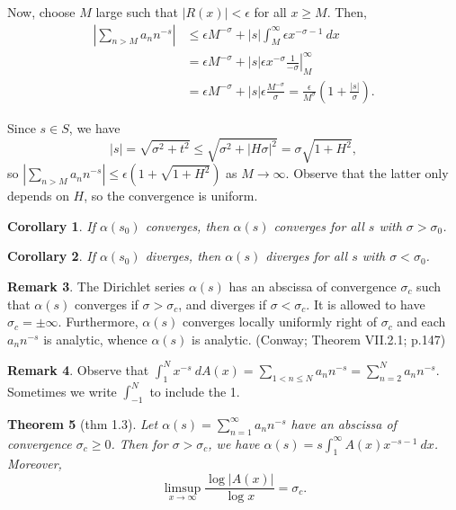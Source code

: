 \documentclass[11pt]{article}
\newtheorem{thm}{Theorem}[subsection]
\newtheorem{cor}[thm]{Corollary}
\theoremstyle{definition}
\newtheorem{remark}[thm]{Remark}
\newcommand{\s}[0]{\sigma}
\newcommand{\abs}[1]{\left\lvert#1\right\rvert} %
\begin{document}
Now, choose $M$ large such that $\abs{R(x)}<\epsilon$ for all $x\ge M$. Then,
\begin{align*}
  \abs{\sum_{n>M}a_nn^{-s}}
  &\le \epsilon M^{-\sigma} + \abs{s}\int_M^\infty \epsilon x^{-\sigma-1} ~dx \\
  &= \epsilon M^{-\s} + \left.\abs{s}\epsilon x^{-\s} \frac1{-\s} \right|_M^\infty \\
  &= \epsilon M^{-\s} + \abs{s} \epsilon \frac{M^{-\s}}{\s}
  = \frac{\epsilon}{M^\s} \left(1 + \frac{\abs{s}}{\s}\right) .
\end{align*}

Since $s\in S$, we have
\[
  \abs{s} = \sqrt{\s^2+t^2} \le \sqrt{\s^2 + \abs{H\s}^2} = \s\sqrt{1+H^2} ,
\]
so $\abs{\sum_{n>M}a_nn^{-s}} \le \epsilon(1+\sqrt{1+H^2})$ as $M\to\infty$. Observe that
the latter only depends on $H$, so the convergence is uniform.
\qedhere

\begin{cor}
If $\alpha(s_0)$ converges, then $\alpha(s)$ converges for all $s$ with $\sigma>\sigma_0$.
\end{cor}

\begin{cor}
If $\alpha(s_0)$ diverges, then $\alpha(s)$ diverges for all $s$ with $\sigma<\sigma_0$.
\end{cor}

\begin{remark}
The Dirichlet series $\alpha(s)$ has an abscissa of convergence $\sigma_c$ such that
$\alpha(s)$ converges if $\sigma>\sigma_c$, and diverges if $\sigma<\sigma_c$. It is
allowed to have $\sigma_c=\pm\infty$. Furthermore, $\alpha(s)$ converges locally uniformly
right of $\sigma_c$ and each $a_nn^{-s}$ is analytic, whence $\alpha(s)$ is analytic.
(Conway; Theorem VII.2.1; p.147)
\end{remark}

\begin{remark}
Observe that $\int_1^N x^{-s} ~dA(x) = \sum_{1<n\le N}a_nn^{-s} = \sum_{n=2}^Na_nn^{-s}$.
Sometimes we write $\int_{-1}^N$ to include the 1.
\end{remark}

\begin{thm}[thm 1.3]\label{thm:1.3}
Let $\alpha(s)=\sum_{n=1}^\infty a_nn^{-s}$ have an abscissa of convergence $\s_c\ge0$.
Then for $\s>\s_c$, we have $\alpha(s)=s\int_1^\infty A(x)x^{-s-1} ~dx$.
Moreover,
\[
  \limsup_{x\to\infty} \frac{\log\abs{A(x)}}{\log x} = \s_c .
\]
\end{thm}
\end{document}
